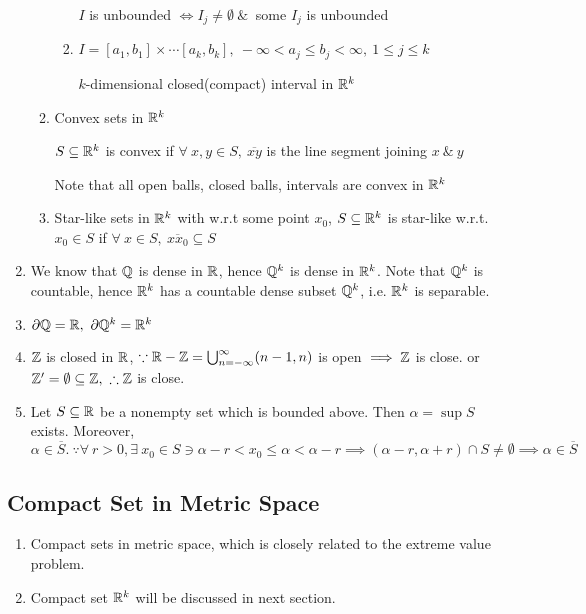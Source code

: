 \begin{enumerate}[wide,label = \textbf{\arabic*.}]
\begin{enumerate}[label = $\bullet$]
\begin{enumerate}
			$I$ is unbounded $\Leftrightarrow I_j \neq \emptyset ~\&~$ some $I_j$ is unbounded
			\item $I = [a_1,b_1] \times \cdots [a_k,b_k],~ -\infty < a_j \leq b_j < \infty,~ 1 \leq j \leq k$
			
			$k$-dimensional closed(compact) interval in $\mathbb{R}^k$
		\end{enumerate}
		
		\item Convex sets in $\mathbb{R}^k$
		
		$S \subseteq \mathbb{R}^k$ is convex if $\forall~ x,y \in S,~\overline{xy}$ is the line segment joining $x ~\&~ y$
		
		Note that all open balls, closed balls, intervals are convex in $\mathbb{R}^k$
		
		\item Star-like sets in $\mathbb{R}^k$ with w.r.t some point $x_0$, $S \subseteq \mathbb{R}^k$ is star-like w.r.t. $x_0 \in S$ if $\forall~x \in S,~\overline{xx_0} \subseteq S$
		
	\end{enumerate}
	\item We know that $\mathbb{Q}$ is dense in $\mathbb{R}$, hence $\mathbb{Q}^k$ is dense in $\mathbb{R}^k$. Note that $\mathbb{Q}^k$ is countable, hence $\mathbb{R}^k$ has a countable dense subset $\mathbb{Q}^k$, i.e. $\mathbb{R}^k$ is separable.
	\item $\partial \mathbb{Q} = \mathbb{R},~\partial \mathbb{Q}^k = \mathbb{R}^k$
	\item $\mathbb{Z}$ is closed in $\mathbb{R}$, $\because \mathbb{R} - \mathbb{Z} = \bigcup^{\infty}_{n = -\infty}(n-1,n)$ is open $\implies \mathbb{Z}$ is close. or $\mathbb{Z}' = \emptyset \subseteq \mathbb{Z},~\therefore \mathbb{Z}$ is close.
	\item Let $S \subseteq \mathbb{R}$ be a nonempty set which is bounded above. Then $\alpha = \sup S$ exists. Moreover, $\alpha \in \overline{S}.~\because \forall~r>0,\exists~x_0 \in S \ni \alpha - r < x_0 \leq \alpha < \alpha - r \implies (\alpha - r,\alpha + r) \cap S \neq \emptyset \implies \alpha \in \overline{S}$
\end{enumerate}

\subsection{Compact Set in Metric Space}

\begin{enumerate}[wide, label = $\bullet$]
	\item Compact sets in metric space, which is closely related to the extreme value problem.
	\item Compact set $\mathbb{R}^k$ will be discussed in next section.
\end{enumerate}

